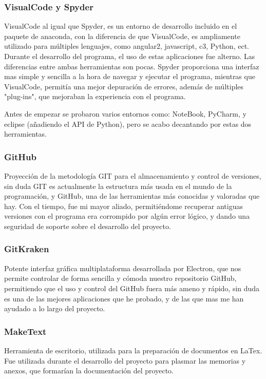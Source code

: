 \subsubsection{VisualCode y Spyder}
VisualCode al igual que Spyder, es un entorno de desarrollo incluido en el paquete de anaconda, con la diferencia de que VisualCode, es ampliamente utilizado  para múltiples lenguajes,  como angular2, javascript, c3, Python, ect.\\

Durante el desarrollo del programa, el uso de estas aplicaciones fue alterno. Las diferencias entre ambas herramientas son pocas. Spyder proporciona una interfaz mas simple y sencilla a la hora de navegar y ejecutar el programa, mientras que VisualCode, permitía una mejor depuración de errores, además de múltiples "plug-ins", que mejoraban la experiencia con el programa.

Antes de empezar se probaron varios entornos como: NoteBook, PyCharm, y eclipse (añadiendo el API de Python), pero se acabo decantando por estas dos herramientas.\\

\subsubsection{GitHub}
Proyección de la metodología GIT para el almacenamiento y control de versiones, sin duda GIT es actualmente la estructura más usada en el mundo de la programación, y GitHub, una de las herramientas más conocidas y valoradas que hay.  Con el tiempo, fue mi mayor aliado, permitiéndome recuperar antiguas versiones con el programa era corrompido por algún error lógico, y dando una seguridad de soporte sobre el desarrollo del proyecto.
\subsubsection{GitKraken}
Potente interfaz gráfica multiplataforma desarrollada por Electron, que nos permite controlar de forma sencilla y cómoda nuestro repositorio GitHub, permitiendo que el uso y control del GitHub fuera más ameno y rápido, sin duda es una de las mejores aplicaciones que he probado, y de las que mas me han ayudado a lo largo del proyecto.
\subsubsection{MakeText}
Herramienta de escritorio, utilizada para la preparación de documentos en LaTex. Fue utilizada durante el desarrollo del proyecto para plasmar las memorias y anexos, que formarían la documentación del proyecto.
